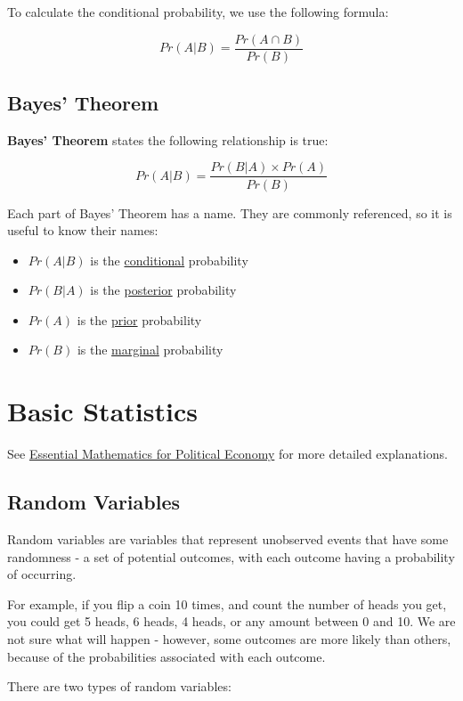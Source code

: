 \documentclass[
  a4paper,
]{report}
\begin{document}
To calculate the conditional probability, we use the following formula:

\[
Pr(A|B) = \frac{Pr(A \cap B)}{Pr(B)}
\]

\section{Bayes' Theorem}\label{bayes-theorem}

\textbf{Bayes' Theorem} states the following relationship is true:

\[
Pr(A|B) = \frac{Pr(B|A) \times Pr(A)}{Pr(B)}
\]

Each part of Bayes' Theorem has a name. They are commonly referenced, so
it is useful to know their names:

\begin{itemize}
\item
  \(Pr(A|B)\) is the \ul{conditional} probability
\item
  \(Pr(B|A)\) is the \ul{posterior} probability
\item
  \(Pr(A)\) is the \ul{prior} probability
\item
  \(Pr(B)\) is the \ul{marginal} probability
\end{itemize}

\chapter{Basic Statistics}\label{basic-statistics}

See \href{https://kevinli03.github.io/maths.pdf}{Essential Mathematics
for Political Economy} for more detailed explanations.

\section{Random Variables}\label{random-variables}

Random variables are variables that represent unobserved events that
have some randomness - a set of potential outcomes, with each outcome
having a probability of occurring.

For example, if you flip a coin 10 times, and count the number of heads
you get, you could get 5 heads, 6 heads, 4 heads, or any amount between
0 and 10. We are not sure what will happen - however, some outcomes are
more likely than others, because of the probabilities associated with
each outcome.

There are two types of random variables:
\end{document}
